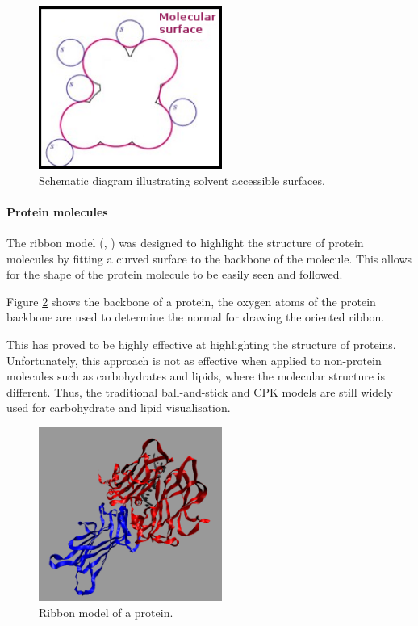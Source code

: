 \begin{figure}
  \begin{center}
    \includegraphics[width=60mm]{sas_ms}
  \end{center}
  \caption{Schematic diagram illustrating solvent accessible surfaces.}
  \label{fig:background_sas}
\end{figure}

\paragraph{Protein molecules}

The ribbon model (\citep{richardson81}, \citep{carson87}) was designed to
highlight the structure of protein molecules by fitting a curved surface to the
backbone of the molecule. This allows for the shape of the protein molecule to
be easily seen and followed.

Figure \ref{fig:background_ribbon} shows the backbone of a protein, the oxygen
atoms of the protein backbone are used to determine the normal for drawing the
oriented ribbon.

This has proved to be highly effective at highlighting the structure of
proteins. Unfortunately, this approach is not as effective when applied to
non-protein molecules such as carbohydrates and lipids, where the molecular
structure is different. Thus, the traditional ball-and-stick and CPK models are
still widely used for carbohydrate and lipid visualisation.

\begin{figure}
  \begin{center}
    \includegraphics[width=60mm]{ribbon}
  \end{center}
  \caption{Ribbon model of a protein.}
  \label{fig:background_ribbon}
\end{figure}

